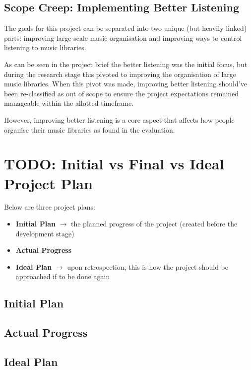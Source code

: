 \subsection{Scope Creep: Implementing Better Listening}
The goals for this project can be separated into two unique (but heavily linked) parts: improving large-scale music organisation and improving ways to control listening to music libraries.

As can be seen in the project brief the better listening was the initial focus, but during the research stage this pivoted to improving the organisation of large music libraries. When this pivot was made, improving better listening should've been re-classified as out of scope to ensure the project expectations remained manageable within the allotted timeframe.

However, improving better listening is a core aspect that affects how people organise their music libraries as found in the evaluation.

\section{TODO: Initial vs Final vs Ideal Project Plan}
Below are three project plans:\begin{itemize}
    \item \textbf{Initial Plan} \(\to\) the planned progress of the project (created before the development stage)
    \item \textbf{Actual Progress}
    \item \textbf{Ideal Plan} \(\to\) upon retrospection, this is how the project should be approached if to be done again
\end{itemize}

\subsection{Initial Plan}%

\subsection{Actual Progress}%

\subsection{Ideal Plan}%

